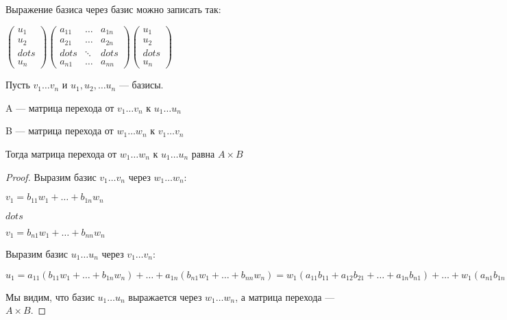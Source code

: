 \begin{remark}
    Выражение базиса через базис можно записать так:

    $\left(
    \begin{array}{c}
        u_{1} \\
        u_{2} \\
        dots \\
        u_{n} 
    \end{array}
    \right) \left(
        \begin{array}{ccc}
            a_{11} & \ldots & a_{1n}\\
            a_{21} & \ldots & a_{2n}\\
            dots & \ddots & dots\\
            a_{n1} &\ldots & a_{nn}
        \end{array}
        \right) \left(
            \begin{array}{c}
                u_{1}\\
                u_{2}\\
                dots\\
                u_{n}
            \end{array}
            \right)$    
\end{remark}

\begin{theorem}
    Пусть $v_1 \ldots v_n$ и $u_1, u_2, \ldots u_n$ --- базисы.

    A --- матрица перехода от $v_1 \ldots v_n$ к $u_1 \ldots u_n$
    
    B --- матрица перехода от $w_1 \ldots w_n$ к $v_1 \ldots v_n$

    Тогда матрица перехода от $w_1 \ldots w_n$ к $u_1 \ldots u_n$ равна $A \times B$
\end{theorem}

\begin{proof} Выразим базис $v_1 \ldots v_n$ через $w_1 \ldots w_n$:
    
    $v_1 = b_{11}w_1 + \ldots + b_{1n}w_n$
    
    $dots$

    $v_1 = b_{n1}w_1 + \ldots + b_{nn}w_n$
   
    Выразим базис $u_1 \ldots u_n$ через $v_1 \ldots v_n$:

    $u_1 = a_{11}(b_{11}w_1 + \ldots + b_{1n}w_n) + \ldots + a_{1n}(b_{n1}w_1 + \ldots + b_{nn}w_n) = w_1(a_{11}b_{11} + a_{12}b_{21} + \ldots + a_{1n}b_{n1}) + \ldots + w_1(a_{n1}b_{1n} + a_{n2}b_{2n} + \ldots + a_{nn}b_{nn})$

    Мы видим, что базис $u_1 \ldots u_n$ выражается через $w_1 \ldots w_n$, а матрица перехода --- $A \times B$.
\end{proof}

